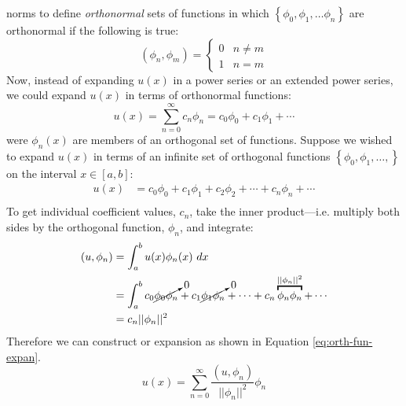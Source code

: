  norms to define \emph{orthonormal} sets of functions in which $\left\{ \phi_0, \phi_1, \dots \phi_n\right\}$ are orthonormal if the following is true:
\begin{equation*}
\left(\phi_n,\phi_m\right) = 
\begin{cases}
0 & n\ne m \\
1 & n=m
\end{cases}
\end{equation*}
Now, instead of expanding $u(x)$ in a power series or an extended power series, we could expand $u(x)$ in terms of orthonormal functions:
\begin{equation*}
u(x) = \sum\limits_{n=0}^{\infty} c_n \phi_n = c_0\phi_0 + c_1\phi_1 + \cdots
\end{equation*}
were $\phi_n(x)$ are members of an orthogonal set of functions. Suppose we wished to expand $u(x)$ in terms of an infinite set of orthogonal functions $\left\{\phi_0,\phi_1,\dots,\right\}$ on the interval $x\in[a,b]$:
\begin{align*}
u(x) &= c_0\phi_0 + c_1\phi_1 + c_2\phi_2 + \cdots + c_n\phi_n + \cdots \\
\end{align*}
To get individual coefficient values, $c_n$, take the inner product---i.e. multiply both sides by the orthogonal function, $\phi_n$, and integrate:
\begin{align*}
\left(u,\phi_n\right) &= \int_{a}^{b}u(x)\phi_n(x) \ dx \\
&= \int_{a}^{b} c_0 \cancelto{0}{\phi_0 \phi_n} + c_1\cancelto{0}{\phi_1 \phi_n} + \cdots + c_n\overbracket{\phi_n \phi_n}^{||\phi_n||^2} + \cdots \\
&= c_n||\phi_n||^2 
\end{align*}
Therefore we can construct or expansion as shown in Equation \ref{eq:orth-fun-expan}.
\begin{equation}
u(x) = \sum\limits_{n=0}^{\infty}\frac{\left(u,\phi_n\right)}{||\phi_n||^2}\phi_n
\label{eq:orth-fun-expan}
\end{equation}

